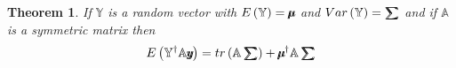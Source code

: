 \documentclass{article}
\newtheorem{theorem}{Theorem}
\begin{document}
\begin{theorem}
If $\mathbb{Y}$ is a random vector with $E\left( \mathbb{Y}\right) =\mathbb{%
\mu\mkern-12.3mu\mu%
}$ and $Var\left( \mathbb{Y}\right) =\mathbb{%
\tsum\mkern-20mu\tsum%
}$ and if $\mathbb{A}$ is a symmetric matrix then%
\begin{equation*}
E\left( \mathbb{Y}^{\mathbb{\dagger }}\mathbb{A}%
y\mkern-11mu y%
\right) =tr\left( \mathbb{A%
\tsum\mkern-20mu\tsum%
}\right) +\mathbb{%
\mu\mkern-12.3mu\mu%
}^{\dagger }\mathbb{A%
\tsum\mkern-20mu\tsum%
}
\end{equation*}


\end{theorem}
\end{document}
